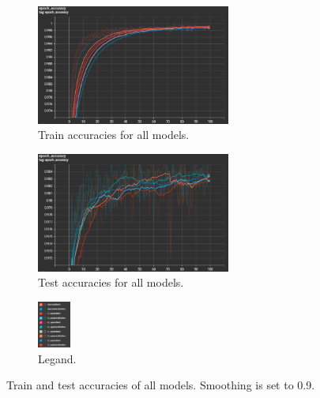 \documentclass{article}
\begin{document}
\begin{figure}[h!]
    \centering
    \begin{subfigure}[t]{\textwidth}
        \centering
        \includegraphics[width=0.7\textwidth]{./plots/screenshot3.png} %
        \caption{Train accuracies for all models.}
        \label{fig:subfig101}
    \end{subfigure}
    \vspace{0.2cm}
    \begin{subfigure}[t]{\textwidth}
        \centering
        \includegraphics[width=0.7\textwidth]{./plots/screenshot4.png} %
        \caption{Test accuracies for all models.}
        \label{fig:subfig102}
    \end{subfigure}
    \vspace{0.2cm}
    \begin{subfigure}[t]{\textwidth}
        \centering
        \includegraphics[width=0.12\textwidth]{./plots/screenshot5.png} %
        \caption{Legand.}
        \label{fig:subfig103}
    \end{subfigure}
    \caption{Train and test accuracies of all models. Smoothing is set to 0.9.}
    \label{fig:plot10}
\end{figure}
\end{document}
